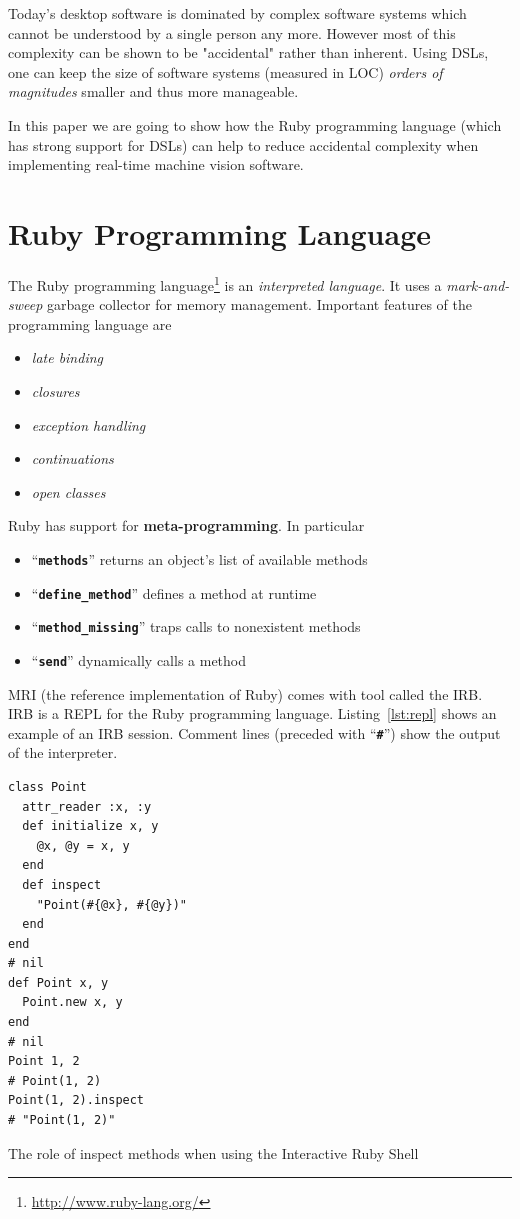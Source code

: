 \documentclass[10pt,journal,compsoc]{joser1}
\newcommand{\code}[1]{``\texttt{\textbf{\textcolor{codegray}{\small{#1}}}}''}
\newcommand{\lst}[1]{Listing~\ref{lst:#1}}
\begin{document}
Today's desktop software is dominated by complex software systems which cannot
be understood by a single person any more. However most of this complexity can
be shown to be "accidental" rather than inherent\citep{ohshima2013kscript}.
Using \acp{DSL}, one can keep the size of software systems (measured in LOC)
\emph{orders of magnitudes} smaller and thus more
manageable\citep{kay2010steps}.

In this paper we are going to show how the Ruby programming language (which has
strong support for DSLs) can help to reduce accidental complexity when
implementing real-time machine vision software.

\section{Ruby Programming Language}
The Ruby programming language\footnote{\url{http://www.ruby-lang.org/}} is an
\emph{interpreted language}. It uses a \emph{mark-and-sweep} garbage collector
for memory management. Important features of the programming language are
\begin{itemize}
  \item \emph{late binding}
  \item \emph{closures}
  \item \emph{exception handling}
  \item \emph{continuations}
  \item \emph{open classes}
\end{itemize}

Ruby has support for \textbf{meta-programming}. In particular
\begin{itemize}
  \item \code{methods} returns an object's list of available methods
  \item \code{define\_method} defines a method at runtime
  \item \code{method\_missing} traps calls to nonexistent methods
  \item \code{send} dynamically calls a method
\end{itemize}

\ac{MRI} (the reference implementation of Ruby) comes with tool called the
\ac{IRB}. \ac{IRB} is a \ac{REPL} for the Ruby programming language. \lst{repl}
shows an example of an \ac{IRB} session. Comment lines (preceded with \code{\#}) show the output of the interpreter.
\begin{listing}[htbp]
  \begin{verbatim}
class Point
  attr_reader :x, :y
  def initialize x, y
    @x, @y = x, y
  end
  def inspect
    "Point(#{@x}, #{@y})"
  end
end
# nil
def Point x, y
  Point.new x, y
end
# nil
Point 1, 2
# Point(1, 2)
Point(1, 2).inspect
# "Point(1, 2)"
  \end{verbatim}
  \caption{The role of inspect methods when using the Interactive Ruby
  Shell\label{lst:repl}}
\end{listing}
\end{document}
